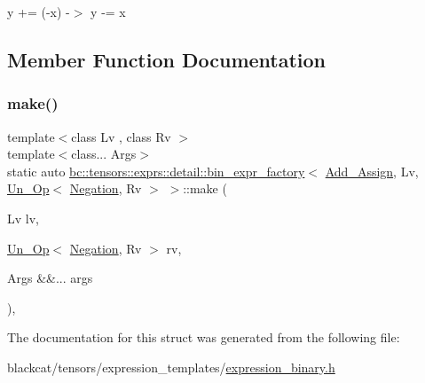 y += (-\/x) -\/$>$ y -\/= x 

\subsection{Member Function Documentation}
\mbox{\label{structbc_1_1tensors_1_1exprs_1_1detail_1_1bin__expr__factory_3_01Add__Assign_00_01Lv_00_01Un__Op_3_01Negation_00_01Rv_01_4_01_4_a9a226059ff726a8da6c8508ab621bb4f}} 
\subsubsection{\texorpdfstring{make()}{make()}}
{\footnotesize\ttfamily template$<$class Lv , class Rv $>$ \\
template$<$class... Args$>$ \\
static auto \hyperlink{structbc_1_1tensors_1_1exprs_1_1detail_1_1bin__expr__factory}{bc\+::tensors\+::exprs\+::detail\+::bin\+\_\+expr\+\_\+factory}$<$ \hyperlink{structbc_1_1oper_1_1Add__Assign}{Add\+\_\+\+Assign}, Lv, \hyperlink{structbc_1_1tensors_1_1exprs_1_1Un__Op}{Un\+\_\+\+Op}$<$ \hyperlink{structbc_1_1oper_1_1Negation}{Negation}, Rv $>$ $>$\+::make (\begin{DoxyParamCaption}\item[{Lv}]{lv,  }\item[{\hyperlink{structbc_1_1tensors_1_1exprs_1_1Un__Op}{Un\+\_\+\+Op}$<$ \hyperlink{structbc_1_1oper_1_1Negation}{Negation}, Rv $>$}]{rv,  }\item[{Args \&\&...}]{args }\end{DoxyParamCaption})\hspace{0.3cm}{\ttfamily [inline]}, {\ttfamily [static]}}



The documentation for this struct was generated from the following file\+:\begin{DoxyCompactItemize}
\item 
blackcat/tensors/expression\+\_\+templates/\hyperlink{expression__binary_8h}{expression\+\_\+binary.\+h}\end{DoxyCompactItemize}
